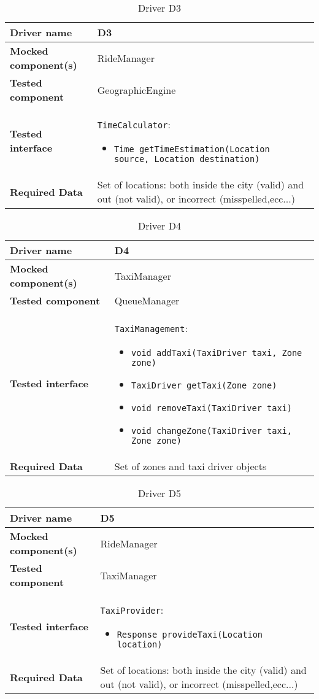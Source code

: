 \begin{table}[H]
	\begin{tabular}{ l | p{} }
		\textbf{Driver name} & D3\label{D3} \\ \hline
		\textbf{Mocked component(s)} & RideManager \\ \hline
		\textbf{Tested component} & GeographicEngine \\ \hline
		\textbf{Tested interface} & \texttt{TimeCalculator}:
		\begin{itemize}
			\item \texttt{Time getTimeEstimation(Location source, Location destination)}
		\end{itemize} \\ \hline
		\textbf{Required Data} & Set of locations: both inside the city (valid) and out (not valid), or incorrect (misspelled,ecc...)
	\end{tabular}
	\caption{Driver D3}
\end{table}

\begin{table}[H]
	\begin{tabular}{ l | p{} }
		\textbf{Driver name} & D4\label{D4} \\ \hline
		\textbf{Mocked component(s)} & TaxiManager \\ \hline
		\textbf{Tested component} & QueueManager \\ \hline
		\textbf{Tested interface} & \texttt{TaxiManagement}:
		\begin{itemize}
			\item \texttt{void addTaxi(TaxiDriver taxi, Zone zone)}
			\item \texttt{TaxiDriver getTaxi(Zone zone)}
			\item \texttt{void removeTaxi(TaxiDriver taxi)}
			\item \texttt{void changeZone(TaxiDriver taxi, Zone zone)}
		\end{itemize} \\ \hline
		\textbf{Required Data} & Set of zones and taxi driver objects
	\end{tabular}
	\caption{Driver D4}
\end{table}


\begin{table}[H]
	\begin{tabular}{ l | p{} }
		\textbf{Driver name} & D5\label{D5} \\ \hline
		\textbf{Mocked component(s)} & RideManager \\ \hline
		\textbf{Tested component} & TaxiManager \\ \hline
		\textbf{Tested interface} & \texttt{TaxiProvider}:
		\begin{itemize}
			\item \texttt{Response provideTaxi(Location location)}
		\end{itemize} \\ \hline
		\textbf{Required Data} & Set of locations: both inside the city (valid) and out (not valid), or incorrect (misspelled,ecc...)
	\end{tabular}
	\caption{Driver D5}
\end{table}

